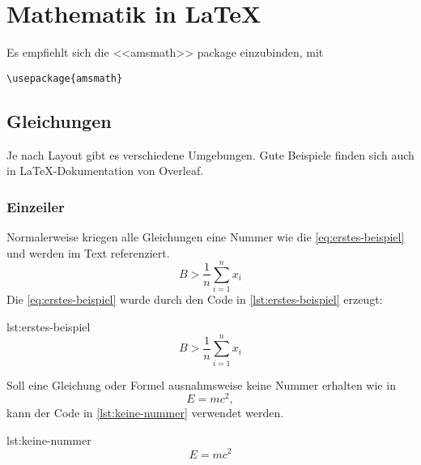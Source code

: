 \chapter{Mathematik in \LaTeX}\label{sec:mathezeugs}
Es empfiehlt sich die <<amsmath>> package einzubinden, mit
\begin{verbatim}
\usepackage{amsmath}
\end{verbatim}

\section{Gleichungen}
Je nach Layout gibt es verschiedene Umgebungen. Gute Beispiele finden sich auch
in \LaTeX{}-Dokumentation von Overleaf\cite{overleaf-equations}.
\subsection{Einzeiler}
Normalerweise kriegen alle Gleichungen eine Nummer wie die
\autoref{eq:erstes-beispiel} und werden im Text referenziert.
\begin{equation} \label{eq:erstes-beispiel}
	B > \frac{1}{n} \sum_{i=1}^n x_i
\end{equation}
%
Die \autoref{eq:erstes-beispiel} wurde durch den Code in
\autoref{lst:erstes-beispiel} erzeugt:
\begin{latexcode}{lst:erstes-beispiel}
\begin{equation} \label{eq:erstes-beispiel}
    B > \frac{1}{n} \sum_{i=1}^n x_i
\end{equation}
\end{latexcode}


\noindent Soll eine Gleichung oder Formel ausnahmsweise keine Nummer erhalten wie in
\[
	E = mc^2,
\]
kann der Code in \autoref{lst:keine-nummer} verwendet werden.
\begin{latexcode}{lst:keine-nummer}
\[
    E = mc^2
\]
\end{latexcode}

